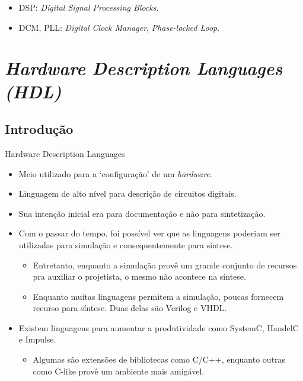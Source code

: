 \documentclass[aspectratio=169]{beamer}
\begin{document}
\begin{frame}
		\begin{itemize} \scriptsize
			\item DSP: \textit{Digital Signal Processing Blocks}.
			\item DCM, PLL: \textit{Digital Clock Manager}, \textit{Phase-locked Loop}.
		\end{itemize}
	\end{frame}

\section{\it{Hardware Description Languages} (HDL)}
	\subsection{Introdução}
	\begin{frame}{Hardware Description Languages}
		\begin{itemize}
			\setlength\itemsep{0.6em}
			\item Meio utilizado para a `configuração' de um \textit{hardware}.
			
			\item Linguagem de alto nível para descrição de circuitos digitais.
			
			\item Sua intenção inicial era para documentação e não para sintetização.
			
			\item Com o passar do tempo, foi possível ver que as linguagens poderiam ser utilizadas para simulação e consequentemente para síntese.
			\begin{itemize}
				\item Entretanto, enquanto a simulação provê um grande conjunto de recursos pra auxiliar o projetista, o mesmo não acontece na síntese.
				\item Enquanto muitas linguagens permitem a simulação, poucas fornecem recurso para síntese. Duas delas são Verilog e VHDL.
			\end{itemize}
			
			\item Existem linguagens para aumentar a produtividade como SystemC, HandelC e Impulse.
			\begin{itemize}
				\item Algumas são extensões de bibliotecas como C/C++, enquanto outras como C-like provê um ambiente mais amigável.
			\end{itemize}
		\end{itemize}
	\end{frame}
	
\end{document}
